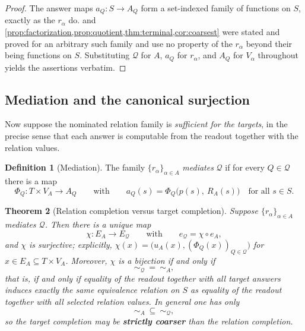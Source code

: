 \documentclass[11pt,reqno]{amsart}
\theoremstyle{plain}
\newtheorem{theorem}{Theorem}[section]
\theoremstyle{definition}
\newtheorem{definition}[theorem]{Definition}
\theoremstyle{remark}
\numberwithin{equation}{section}
\begin{document}
\begin{proof}
The answer maps $a_Q\colon S\to A_Q$ form a set-indexed family of functions on $S$, exactly as the
$r_\alpha$ do.  and
\cref{prop:factorization,prop:quotient,thm:terminal,cor:coarsest} were stated and proved for an
arbitrary such family and use no property of the $r_\alpha$ beyond their being functions on $S$.
Substituting $\mathcal Q$ for $A$, $a_Q$ for $r_\alpha$, and $A_Q$ for $V_\alpha$ throughout yields
the assertions verbatim.
\end{proof}

\subsection{Mediation and the canonical surjection}

Now suppose the nominated relation family is \emph{sufficient for the targets}, in the precise sense
that each answer is computable from the readout together with the relation values.

\begin{definition}[Mediation]
\label{def:mediation}
The family $\{r_\alpha\}_{\alpha\in A}$ \emph{mediates} $\mathcal Q$ if for every $Q\in\mathcal Q$
there is a map
\begin{equation}
\label{eq:Phi}
\Phi_Q\colon T\times V_A\longrightarrow A_Q
\qquad\text{with}\qquad
a_Q(s)=\Phi_Q\bigl(p(s),\ R_A(s)\bigr)\quad\text{for all }s\in S .
\end{equation}
\end{definition}

\begin{theorem}[Relation completion versus target completion]
\label{thm:chi}
Suppose $\{r_\alpha\}_{\alpha\in A}$ mediates $\mathcal Q$. Then there is a \emph{unique} map
\begin{equation}
\label{eq:chi}
\chi\colon E_A\longrightarrow E_{\mathcal Q}
\qquad\text{with}\qquad
e_{\mathcal Q}=\chi\circ e_A ,
\end{equation}
and $\chi$ is surjective; explicitly,
$\chi(x)=\bigl(u_A(x),(\Phi_Q(x))_{Q\in\mathcal Q}\bigr)$ for $x\in E_A\subseteq T\times V_A$.
Moreover, $\chi$ is a bijection if and only if
\begin{equation}
\label{eq:chi-iso}
\sim_{\mathcal Q}\ =\ \sim_A ,
\end{equation}
that is, if and only if equality of the readout together with all target answers induces exactly the
same equivalence relation on $S$ as equality of the readout together with all selected relation
values. In general one has only
\begin{equation}
\label{eq:chi-order}
\sim_A\ \subseteq\ \sim_{\mathcal Q} ,
\end{equation}
so the target completion may be \textbf{strictly coarser} than the relation completion.
\end{theorem}
\end{document}

